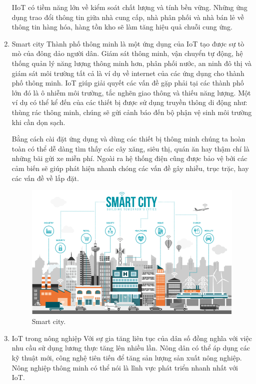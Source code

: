 \begin{enumerate}
    IIoT có tiềm năng lớn về kiểm soát chất lượng và tính bền vững. Những ứng dụng trao đổi thông tin giữa nhà cung cấp, nhà phân phối và nhà bán lẻ về thông tin hàng hóa, hàng tồn kho sẽ làm tăng hiệu quả chuỗi cung ứng.
    
    \item Smart city
    Thành phố thông minh là một ứng dụng của IoT tạo được sự tò mò của đông dảo người dân. Giám sát thông minh, vận chuyển tự động, hệ thống quản lý năng lượng thông minh hơn, phân phối nước, an ninh đô thị và giám sát môi trường tất cả là ví dụ về internet của các ứng dụng cho thành phố thông minh. IoT giúp giải quyết các vấn đề gặp phải tại các thành phố lớn đó là ô nhiễm môi trường, tắc nghẽn giao thông và thiếu năng lượng. Một ví dụ có thể kể đến của các thiết bị được sử dụng truyền thông di động như: thùng rác thông minh, chúng sẽ gửi cảnh báo đến bộ phận vệ sinh môi trường khi cần dọn sạch.

    Bằng cách cài đặt ứng dụng và dùng các thiết bị thông minh chúng ta hoàn toàn có thể dễ dàng tìm thấy các cây xăng, siêu thị, quán ăn hay thậm chí là những bãi gửi xe miễn phí. Ngoài ra hệ thống điện cũng được bảo vệ bởi các cảm biến sẽ giúp phát hiện nhanh chóng các vấn đề gây nhiễu, trục trặc, hay các vấn đề về lắp đặt.
    
\begin{center}
    \begin{figure}[htp]
    \begin{center}
     \includegraphics[scale=0.6]{image1/city.png}
    \end{center}
    \caption{Smart city.}
    \label{refhinh1}
    \end{figure}
\end{center} 
    \item IoT trong nông nghiệp
    Với sự gia tăng liên tục của dân số đồng nghĩa với việc nhu cầu sử dụng lương thực tăng lên nhiều lần. Nông dân có thể áp dụng các kỹ thuật mới, công nghệ tiên tiến để tăng sản lượng sản xuất nông nghiệp. Nông nghiệp thông minh có thể nói là lĩnh vực phát triển nhanh nhất với IoT.


\end{enumerate}
